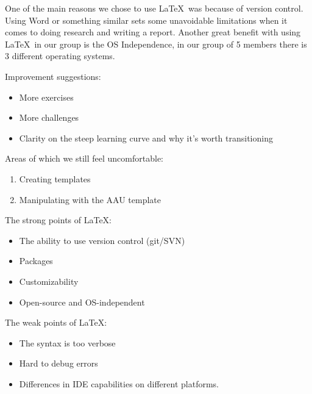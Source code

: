 %


One of the main reasons we chose to use \LaTeX\ was because of version control. Using Word or something similar sets some unavoidable limitations when it comes to doing research and writing a report. 
Another great benefit with using \LaTeX\ in our group is the OS Independence, in our group of 5 members there is 3 different operating systems.

Improvement suggestions:
\begin{itemize}
	\item More exercises
	\item More challenges
	\item Clarity on the steep learning curve and why it's worth transitioning
\end{itemize}

Areas of which we still feel uncomfortable:
\begin{enumerate}
	\item Creating templates
	\item Manipulating with the AAU template
\end{enumerate}

The strong points of \LaTeX:
\begin{itemize}
	\item The ability to use version control (git/SVN)
	\item Packages
	\item Customizability
	\item Open-source and OS-independent
\end{itemize}

The weak points of \LaTeX:
\begin{itemize}
	\item The syntax is too verbose
	\item Hard to debug errors
	\item Differences in IDE capabilities on different platforms.
\end{itemize}
